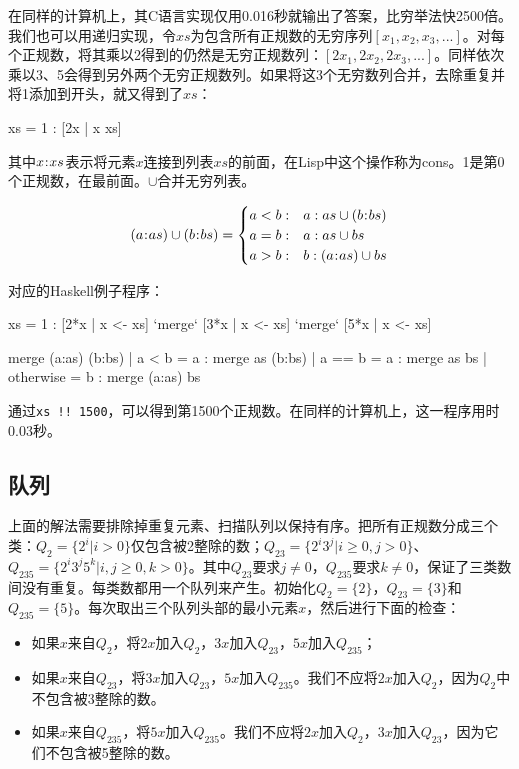 \documentclass[b5paper]{ctexart}
\begin{document}
在同样的计算机上，其C语言实现仅用0.016秒就输出了答案，比穷举法快2500倍。我们也可以用递归实现，令$xs$为包含所有正规数的无穷序列$[x_1, x_2, x_3, ...]$。对每个正规数，将其乘以2得到的仍然是无穷正规数列：$[2x_1, 2x_2, 2x_3, ...]$。同样依次乘以3、5会得到另外两个无穷正规数列。如果将这3个无穷数列合并，去除重复并将1添加到开头，就又得到了$xs$：

\be
  xs = 1 : [2x | x \gets xs] \cup [3x | x \gets xs] \cup [5x | x \gets xs]
\ee

其中$x \mathbin{\!:\!} xs$表示将元素$x$连接到列表$xs$的前面，在Lisp中这个操作称为cons。1是第0个正规数，在最前面。$\cup$合并无穷列表。

\[
(a \cons as) \cup (b \cons bs) = \begin{cases}
  a < b: & a : as \cup (b \cons bs) \\
  a = b: & a : as \cup bs \\
  a > b: & b : (a \cons as) \cup bs \\
\end{cases}
\]

对应的Haskell例子程序：
\begin{Haskell}
xs = 1 : [2*x | x <- xs] `merge` [3*x | x <- xs] `merge` [5*x | x <- xs]

merge (a:as) (b:bs) | a < b = a : merge as (b:bs)
                    | a == b = a : merge as bs
                    | otherwise = b : merge (a:as) bs
\end{Haskell}

通过\texttt{xs !! 1500}，可以得到第1500个正规数。在同样的计算机上，这一程序用时0.03秒。

\subsection*{队列}
上面的解法需要排除掉重复元素、扫描队列以保持有序。把所有正规数分成三个类：$Q_2 = \{2^i | i > 0\}$仅包含被2整除的数；$Q_{23} = \{ 2^i3^j | i \geq 0, j > 0 \}$、$Q_{235} = \{ 2^i3^j5^k | i,j \geq 0, k > 0\}$。其中$Q_{23}$要求$j \neq 0$，$Q_{235}$要求$k \neq 0$，保证了三类数间没有重复。每类数都用一个队列来产生。初始化$Q_2=\{ 2 \}$，$Q_{23} = \{ 3 \}$和$Q_{235} = \{ 5 \}$。每次取出三个队列头部的最小元素$x$，然后进行下面的检查：

\begin{itemize}
\item 如果$x$来自$Q_2$，将$2x$加入$Q_2$，$3x$加入$Q_{23}$，$5x$加入$Q_{235}$；
\item 如果$x$来自$Q_{23}$，将$3x$加入$Q_{23}$，$5x$加入$Q_{235}$。我们不应将$2x$加入$Q_2$，因为$Q_2$中不包含被3整除的数。
\item 如果$x$来自$Q_{235}$，将$5x$加入$Q_{235}$。我们不应将$2x$加入$Q_2$，$3x$加入$Q_{23}$，因为它们不包含被5整除的数。
\end{itemize}
\end{document}
